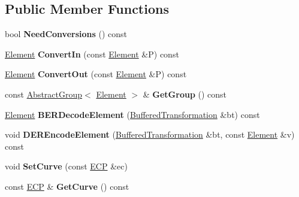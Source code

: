 \subsection*{Public Member Functions}
\begin{DoxyCompactItemize}
\item 
\hypertarget{class_ec_precomputation_3_01_e_c_p_01_4_a2526b01bd80e1bf32118bee19f4a8d18}{
bool {\bfseries NeedConversions} () const }
\label{class_ec_precomputation_3_01_e_c_p_01_4_a2526b01bd80e1bf32118bee19f4a8d18}

\item 
\hypertarget{class_ec_precomputation_3_01_e_c_p_01_4_af45796cc36401086781e32f3f73d3ea9}{
\hyperlink{struct_e_c_p_point}{Element} {\bfseries ConvertIn} (const \hyperlink{struct_e_c_p_point}{Element} \&P) const }
\label{class_ec_precomputation_3_01_e_c_p_01_4_af45796cc36401086781e32f3f73d3ea9}

\item 
\hypertarget{class_ec_precomputation_3_01_e_c_p_01_4_acb9b550d21bb553eec6804638736b744}{
\hyperlink{struct_e_c_p_point}{Element} {\bfseries ConvertOut} (const \hyperlink{struct_e_c_p_point}{Element} \&P) const }
\label{class_ec_precomputation_3_01_e_c_p_01_4_acb9b550d21bb553eec6804638736b744}

\item 
\hypertarget{class_ec_precomputation_3_01_e_c_p_01_4_a0380310d91b3da7cd3eff761a3130ef8}{
const \hyperlink{class_abstract_group}{AbstractGroup}$<$ \hyperlink{struct_e_c_p_point}{Element} $>$ \& {\bfseries GetGroup} () const }
\label{class_ec_precomputation_3_01_e_c_p_01_4_a0380310d91b3da7cd3eff761a3130ef8}

\item 
\hypertarget{class_ec_precomputation_3_01_e_c_p_01_4_ac44b14e7f09e1d3133776ac5e5ca79c5}{
\hyperlink{struct_e_c_p_point}{Element} {\bfseries BERDecodeElement} (\hyperlink{class_buffered_transformation}{BufferedTransformation} \&bt) const }
\label{class_ec_precomputation_3_01_e_c_p_01_4_ac44b14e7f09e1d3133776ac5e5ca79c5}

\item 
\hypertarget{class_ec_precomputation_3_01_e_c_p_01_4_a7a82650f5578ae1dee691842b0030fcc}{
void {\bfseries DEREncodeElement} (\hyperlink{class_buffered_transformation}{BufferedTransformation} \&bt, const \hyperlink{struct_e_c_p_point}{Element} \&v) const }
\label{class_ec_precomputation_3_01_e_c_p_01_4_a7a82650f5578ae1dee691842b0030fcc}

\item 
\hypertarget{class_ec_precomputation_3_01_e_c_p_01_4_a900bdf40eea4c90ebd4fbf52f53d3b6a}{
void {\bfseries SetCurve} (const \hyperlink{class_e_c_p}{ECP} \&ec)}
\label{class_ec_precomputation_3_01_e_c_p_01_4_a900bdf40eea4c90ebd4fbf52f53d3b6a}

\item 
\hypertarget{class_ec_precomputation_3_01_e_c_p_01_4_a143774af16d5c2bd3485cf8ba732ab83}{
const \hyperlink{class_e_c_p}{ECP} \& {\bfseries GetCurve} () const }
\label{class_ec_precomputation_3_01_e_c_p_01_4_a143774af16d5c2bd3485cf8ba732ab83}

\end{DoxyCompactItemize}


